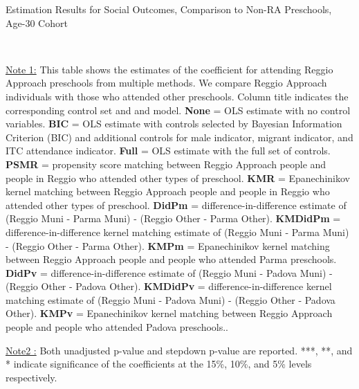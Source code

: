 \begin{table}[H] \caption{Estimation Results for Social Outcomes, Comparison to Non-RA Preschools, Age-30 Cohort} \label{ols-S-adult30-reg-other}
\scalebox{0.6}{}
\vspace{1ex} \\
\footnotesize\raggedright{\underline{Note 1:} This table shows the estimates of the coefficient for attending Reggio Approach preschools from multiple methods. We compare Reggio Approach individuals with those who attended other preschools. Column title indicates the corresponding control set and and model. \textbf{None} = OLS estimate with no control variables. \textbf{BIC} = OLS estimate with controls selected by Bayesian Information Criterion (BIC) and additional controls for male indicator, migrant indicator, and ITC attendance indicator. \textbf{Full} = OLS estimate with the full set of controls. \textbf{PSMR} =  propensity score matching between Reggio Approach people and people in Reggio who attended other types of preschool. \textbf{KMR} = Epanechinikov kernel matching between Reggio Approach people and people in Reggio who attended other types of preschool. \textbf{DidPm} = difference-in-difference estimate of (Reggio Muni - Parma Muni) - (Reggio Other - Parma Other). \textbf{KMDidPm} = difference-in-difference kernel matching estimate of (Reggio Muni - Parma Muni) - (Reggio Other - Parma Other).   \textbf{KMPm} = Epanechinikov kernel matching between Reggio Approach people and people who attended Parma preschools. \textbf{DidPv} = difference-in-difference estimate of (Reggio Muni - Padova Muni) - (Reggio Other - Padova Other). \textbf{KMDidPv} = difference-in-difference kernel matching estimate of (Reggio Muni - Padova Muni) - (Reggio Other - Padova Other).  \textbf{KMPv} = Epanechinikov kernel matching between Reggio Approach people and people who attended Padova preschools..} 

\footnotesize\raggedright{\underline{Note2 :} Both unadjusted p-value and stepdown p-value are reported. ***, **, and * indicate significance of the coefficients at the 15\%, 10\%, and 5\% levels respectively.}
\end{table}

